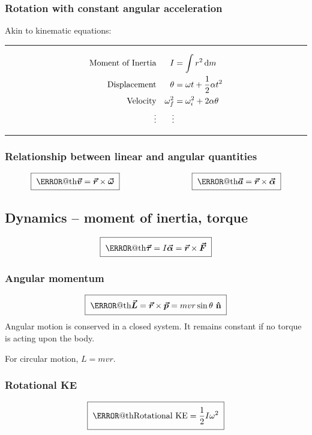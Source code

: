 \documentclass[11pt]{article}
\makeatletter
\renewcommand{\boxed}[2][\fboxsep]{{%
		\setlength{\fboxsep}{#1}\fbox{\m@th$\displaystyle#2$}}}
\numberwithin{equation}{section}
\newcommand{\uvec}[1]{\boldsymbol{\hat{\textbf{#1}}}}
\newcommand{\bvec}[1]{\boldsymbol{\vec{#1}}}
\makeatother
\begin{document}
			\subsubsection{Rotation with constant angular acceleration}
				Akin to kinematic equations:
				\vspace{1em}
				\hrule
				\vspace{-1em}
				\begin{align*}
					\text{Moment of Inertia}&& I&=\int r^2 \dif m \\
					\text{Displacement} && \theta&=\omega t + \frac{1}{2}\alpha t^2 \\
					\text{Velocity} && \omega_f^2 &=\omega_i^2 + 2\alpha\theta\\
					\vdots && \vdots
				\end{align*}
				\vspace{-0.5em}
				\hrule
			\pagebreak
			\subsubsection{Relationship between linear and angular quantities}
				\begin{equation*}
					\boxed[2\fboxsep]{\bvec{v} = \bvec{r} \times \bvec{\omega}}
					~~~~~~~~~~~~~~~~~~~~~~~~~~
					\boxed[2\fboxsep]{\bvec{a} = \bvec{r} \times \bvec{\alpha}}
				\end{equation*}
		\subsection{Dynamics {\small \normalfont -- moment of inertia, torque}}
			\begin{equation*}
				\boxed[2\fboxsep]{\bvec{\tau} = I\bvec{\alpha} = \bvec{r}\times\bvec{F}}
			\end{equation*}
			\subsubsection{Angular momentum}
				\begin{equation*}
					\boxed[2\fboxsep]{\bvec{L}=\bvec{r}\times \bvec{p}=mvr\sin\theta ~\uvec{n}}
				\end{equation*}
				Angular motion is conserved in a closed system. It remains constant if no torque is acting upon the body.
				
				For circular motion, $L=mvr$.
			\subsubsection{Rotational KE}
				\begin{equation*}
					\boxed[2\fboxsep]{\text{Rotational KE}=\frac{1}{2}I\omega^2}
				\end{equation*}
	\pagebreak
\end{document}

